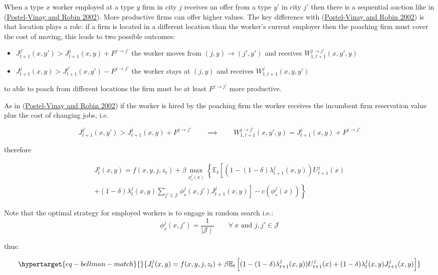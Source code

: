 \documentclass[
  letterpaper,
  DIV=11,
  numbers=noendperiod]{scrreprt}
\providecommand{\tightlist}{%
  \setlength{\itemsep}{0pt}\setlength{\parskip}{0pt}}\usepackage{longtable,booktabs,array}
\begin{document}
When a type \(x\) worker employed at a type \(y\) firm in city \(j\)
receives an offer from a type \(y'\) in city \(j'\) then there is a
sequential auction like in
(\protect\hyperlink{ref-postel-vinayEquilibriumWageDispersion2002}{Postel-Vinay
and Robin 2002}). More productive firms can offer higher values. The key
difference with
(\protect\hyperlink{ref-postel-vinayEquilibriumWageDispersion2002}{Postel-Vinay
and Robin 2002}) is that location plays a role: if a firm is located in
a different location than the worker's current employer then the
poaching firm must cover the cost of moving, this leads to two possible
outcomes:

\begin{itemize}
\tightlist
\item
  \(J^{j'}_{t+1}(x,y')>J^j_{t+1}(x,y)+F^{j\to j'}\) the worker moves
  from \((j,y) \to (j',y')\) and receives
  \(W^{j\to j'}_{1,t+1}(x,y',y)\)
\item
  \(J^j_{t+1}(x,y)>J^{j'}_{t+1}(x,y')-F^{j\to j'}\) the worker stays at
  \((j,y)\) and receives \(W^{j}_{1,t+1}(x,y,y')\)
\end{itemize}

to able to poach from different locations the firm must be at least
\(F^{j\to j'}\) more productive.

As in
(\protect\hyperlink{ref-postel-vinayEquilibriumWageDispersion2002}{Postel-Vinay
and Robin 2002}) if the worker is hired by the poaching firm the worker
receives the incumbent firm reservation value plus the cost of changing
jobs, i.e.

\[J^{j'}_{t+1}(x,y')>J^{j}_{t+1}(x,y)+F^{j\to j'}  \qquad \implies \qquad W^{j\to j'}_{1,t+1}(x,y',y) = J^{j}_{t+1}(x,y)+F^{j\to j'}\]

therefore

\begin{align*}
    J^j_{t}(x,y)=f(x,y,j,z_t)+\beta\max_{\phi^j_s(x)}\left\{\mathbb{E}_t\left[(1 - (1-\delta)\lambda^j_{t+1}(x,y))U^j_{t+1}(x) \right.\right. \\ \left.\left. + (1-\delta) \lambda^j_t(x,y)\sum_{j'\in\mathcal{J}}\phi_s^j(x,j')J^j_{t+1}(x,y)\right] - c(\phi^j_s(x))\right\}
\end{align*}

Note that the optimal strategy for employed workers is to engage in
random search i.e.:
\[\phi_{s}^{j}(x, j') = \frac{1}{\mid\mathcal{J}\mid} \qquad \forall\:x \text{ and }j,j'\in\mathcal{J}\]

thus:

\begin{equation}\protect\hypertarget{eq-bellman-match}{}{J^j_{t}(x,y)=f(x,y,j,z_t)+\beta\mathbb{E}_t\left[(1 - (1-\delta)\lambda^j_{t+1}(x,y))U^j_{t+1}(x) + (1-\delta) \lambda^j_t(x,y)J^j_{t+1}(x,y)\right]}\label{eq-bellman-match}\end{equation}
\end{document}
